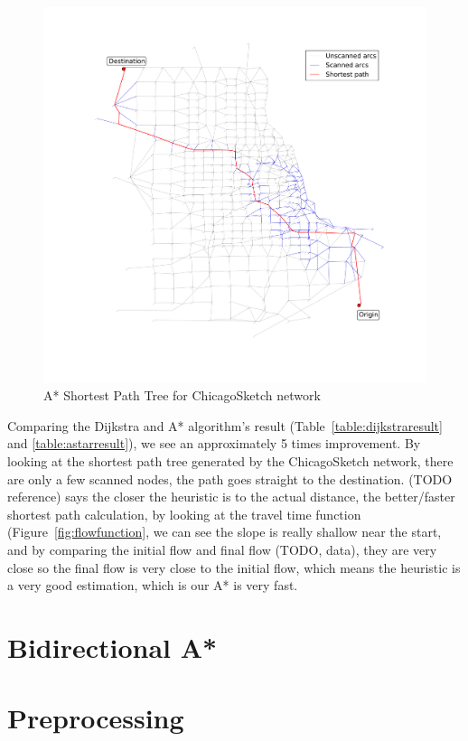 \begin{figure}
    \includegraphics[width=\textwidth,trim=120px 120px 48px 120px,clip]{img/Astar_Chicago}
    \caption{A* Shortest Path Tree for ChicagoSketch network}
    \label{fig:astarchicago}
\end{figure}
Comparing the Dijkstra and A* algorithm's result (Table~\ref{table:dijkstraresult} and \ref{table:astarresult}),
we see an approximately 5 times improvement.
By looking at the shortest path tree generated
by the ChicagoSketch network,
there are only a few scanned nodes,
the path goes straight to the destination.
(TODO reference) says the closer the heuristic is to the actual
distance,
the better/faster shortest path calculation,
by looking at the travel time function (Figure~\ref{fig:flowfunction}, we can see the slope
is really shallow near the start,
and by comparing the initial flow and final flow (TODO, data),
they are very close so the final flow is very close to the
initial flow,
which means the heuristic is a very good estimation,
which is our A* is very fast.

\section{Bidirectional A*}
\section{Preprocessing}
